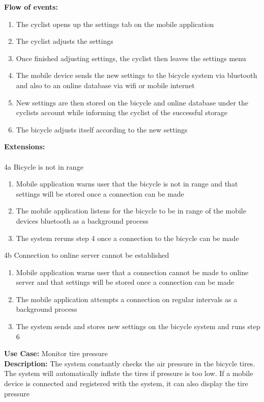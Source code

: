 \documentclass[a4paper]{report}
\begin{document}
\textbf{Flow of events:} \begin{enumerate}
\item The cyclist opens up the settings tab on the mobile application
\item The cyclist adjusts the settings
\item Once finished adjusting settings, the cyclist then leaves the settings menu
\item The mobile device sends the new settings to the bicycle system via bluetooth and also to an online database via wifi or mobile internet
\item New settings are then stored on the bicycle and online database under the cyclists account while informing the cyclist of the successful storage
\item The bicycle adjusts itself according to the new settings
\end{enumerate}
\textbf{Extensions:} \\\\
4a Bicycle is not in range
\begin{enumerate}
\item Mobile application warns user that the bicycle is not in range and that settings will be stored once a connection can be made
\item The mobile application listens for the bicycle to be in range of the mobile devices bluetooth as a background process
\item The system reruns step 4 once a connection to the bicycle can be made
\end{enumerate}
4b Connection to online server cannot be established
\begin{enumerate}
\item Mobile application warns user that a connection cannot be made to online server and that settings will be stored once a connection can be made
\item The mobile application attempts a connection on regular intervals as a background process
\item The system sends and stores new settings on the bicycle system and runs step 6
\end{enumerate}
\textbf{Use Case:} Monitor tire pressure\\
\textbf{Description:} The system constantly checks the air pressure in the bicycle tires. The system will automatically inflate the tires if pressure is too low. If a mobile device is connected and registered with the system, it can also display the tire pressure\\
\end{document}
